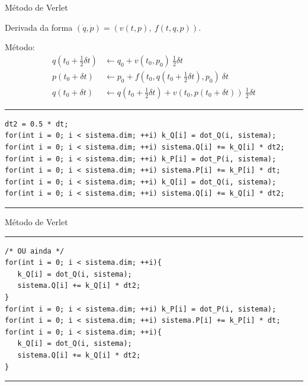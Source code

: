 \documentclass{beamer}
\begin{document}
\begin{frame}[fragile]{Método de Verlet}

   {\scriptsize Derivada da forma $(\dot q, \dot p) = (v(t, p), ~ f(t, q, p))$.}

   Método:
   \begin{align}
      q(t_0 + {\textstyle\frac{1}{2}} \delta t) &\leftarrow q_0 + v(t_0, p_0) ~ {\textstyle\frac{1}{2}} \delta t \\
      p(t_0 + \delta t) &\leftarrow p_0 + f(t_0, q(t_0 + {\textstyle\frac{1}{2}} \delta t), p_0) ~ \delta t \\
      q(t_0 + \delta t) &\leftarrow q(t_0 + {\textstyle\frac{1}{2}} \delta t) + v(t_0, p(t_0 + \delta t)) ~ {\textstyle\frac{1}{2}} \delta t
   \end{align}

   \rule{\textwidth}{1pt}
   \scriptsize
\begin{lstlisting}[style = c]
dt2 = 0.5 * dt;
for(int i = 0; i < sistema.dim; ++i) k_Q[i] = dot_Q(i, sistema);
for(int i = 0; i < sistema.dim; ++i) sistema.Q[i] += k_Q[i] * dt2;
for(int i = 0; i < sistema.dim; ++i) k_P[i] = dot_P(i, sistema);
for(int i = 0; i < sistema.dim; ++i) sistema.P[i] += k_P[i] * dt;
for(int i = 0; i < sistema.dim; ++i) k_Q[i] = dot_Q(i, sistema);
for(int i = 0; i < sistema.dim; ++i) sistema.Q[i] += k_Q[i] * dt2;
\end{lstlisting}
   \rule{\textwidth}{1pt}
\end{frame}

\begin{frame}[fragile]{Método de Verlet}

   \rule{\textwidth}{1pt}
   \scriptsize
\begin{lstlisting}[style = c]
/* OU ainda */
for(int i = 0; i < sistema.dim; ++i){
   k_Q[i] = dot_Q(i, sistema);
   sistema.Q[i] += k_Q[i] * dt2;
}
for(int i = 0; i < sistema.dim; ++i) k_P[i] = dot_P(i, sistema);
for(int i = 0; i < sistema.dim; ++i) sistema.P[i] += k_P[i] * dt;
for(int i = 0; i < sistema.dim; ++i){
   k_Q[i] = dot_Q(i, sistema);
   sistema.Q[i] += k_Q[i] * dt2;
}
\end{lstlisting}
   \rule{\textwidth}{1pt}
\end{frame}

\subsection*{}
\end{document}
